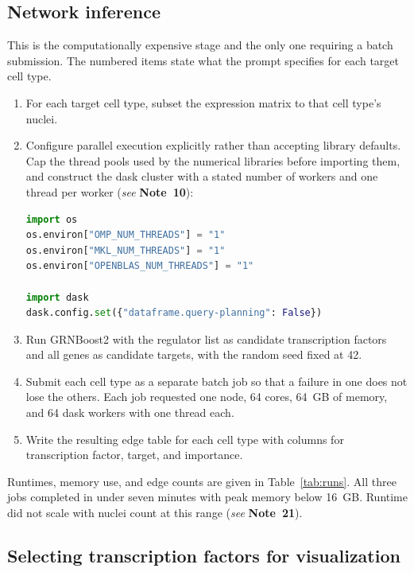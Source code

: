\documentclass[11pt,a4paper]{article}
\newcommand{\seenote}[1]{(\textit{see} \textbf{Note~#1})}
\begin{document}
\subsection{Network inference}

This is the computationally expensive stage and the only one requiring a batch submission. The numbered items state what the prompt specifies for each target cell type.

\begin{enumerate}[leftmargin=*]
\item For each target cell type, subset the expression matrix to that cell type's nuclei.

\item Configure parallel execution explicitly rather than accepting library defaults. Cap the thread pools used by the numerical libraries before importing them, and construct the dask \cite{dask2016} cluster with a stated number of workers and one thread per worker \seenote{10}:


\begin{lstlisting}[language=Python]
import os
os.environ["OMP_NUM_THREADS"] = "1"
os.environ["MKL_NUM_THREADS"] = "1"
os.environ["OPENBLAS_NUM_THREADS"] = "1"

import dask
dask.config.set({"dataframe.query-planning": False})
\end{lstlisting}

\item Run GRNBoost2 with the regulator list as candidate transcription factors and all genes as candidate targets, with the random seed fixed at 42.

\item Submit each cell type as a separate batch job so that a failure in one does not lose the others. Each job requested one node, 64 cores, 64~GB of memory, and 64 dask workers with one thread each.

\item Write the resulting edge table for each cell type with columns for transcription factor, target, and importance.
\end{enumerate}

Runtimes, memory use, and edge counts are given in Table~\ref{tab:runs}. All three jobs completed in under seven minutes with peak memory below 16~GB. Runtime did not scale with nuclei count at this range \seenote{21}.

\subsection{Selecting transcription factors for visualization}
\end{document}
